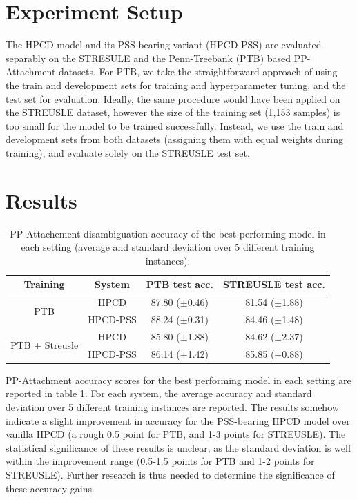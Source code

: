 \section{Experiment Setup} \label{sec:ppatt_setup}

The HPCD model and its PSS-bearing variant (HPCD-PSS) are evaluated separably on the STRESULE and the Penn-Treebank (PTB) based PP-Attachment datasets. For PTB, we take the straightforward approach of using the train and development sets for training and hyperparameter tuning, and the test set for evaluation. Ideally, the same procedure would have been applied on the STREUSLE dataset, however the size of the training set (1,153 samples) is too small for the model to be trained successfully. Instead, we use the train and development sets from both datasets (assigning them with equal weights during training), and evaluate solely on the STREUSLE test set. 

\section{Results} \label{sec:ppatt_results}

\begin{table}[]
    \setlength{\tabcolsep}{10pt} %
    \renewcommand{\arraystretch}{1.5}
    \newcommand{\score}[2]{#1 {\footnotesize ($\pm$#2)}}
    \centering
    \begin{tabular}{c|c|c|c}
         Training                        & System   & PTB test acc. & STREUSLE test acc.\\ \hline
         \multirow{2}{*}{PTB}            & HPCD     & \score{87.80}{0.46} & \score{81.54}{1.88}         \\ 
                                         & HPCD-PSS & \score{88.24}{0.31} & \score{84.46}{1.48}         \\ \hline
         \multirow{2}{*}{PTB + Streusle} & HPCD     & \score{85.80}{1.88} & \score{84.62}{2.37}         \\ 
                                         & HPCD-PSS & \score{86.14}{1.42} & \score{85.85}{0.88}         \\ \hline
    \end{tabular}
    \caption{PP-Attachement disambiguation accuracy of the best performing model in each setting (average and standard deviation over 5 different training instances).}
    \label{tab:hpcdresults}
\end{table}

PP-Attachment accuracy scores for the best performing model in each setting are reported in table \ref{tab:hpcdresults}. For each system, the average accuracy and standard deviation over 5 different training instances are reported. The results somehow indicate a slight improvement in accuracy for the PSS-bearing HPCD model over vanilla HPCD (a rough 0.5 point for PTB, and 1-3 points for STREUSLE). The statistical significance of these results is unclear, as the standard deviation is well within the improvement range (0.5-1.5 points for PTB and 1-2 points for STREUSLE). Further research is thus needed to determine the significance of these accuracy gains. 

